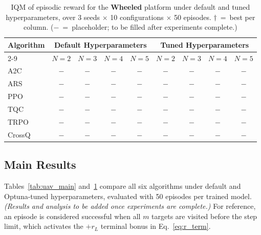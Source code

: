 \documentclass{article}
\begin{document}
\begin{table}[tbp]
\centering
\footnotesize
\caption{\small IQM of episodic reward for the \textbf{Wheeled} platform under default and tuned hyperparameters, over 3 seeds $\times$ 10 configurations $\times$ 50 episodes.
$\dagger$~=~best per column. ($-$~=~placeholder; to be filled after experiments complete.)}
\label{tab:whl_main}
\begin{tabular}{l|cccc|cccc}
    \toprule
    \multirow{2}{*}{\textbf{Algorithm}}
        & \multicolumn{4}{c|}{\textbf{Default Hyperparameters}}
        & \multicolumn{4}{c}{\textbf{Tuned Hyperparameters}} \\
    \cmidrule(lr){2-9}
           & $N=2$ & $N=3$ & $N=4$ & $N=5$
           & $N=2$ & $N=3$ & $N=4$ & $N=5$ \\
    \midrule
    A2C    & $-$ & $-$ & $-$ & $-$ & $-$ & $-$ & $-$ & $-$ \\
    ARS    & $-$ & $-$ & $-$ & $-$ & $-$ & $-$ & $-$ & $-$ \\
    PPO    & $-$ & $-$ & $-$ & $-$ & $-$ & $-$ & $-$ & $-$ \\
    TQC    & $-$ & $-$ & $-$ & $-$ & $-$ & $-$ & $-$ & $-$ \\
    TRPO   & $-$ & $-$ & $-$ & $-$ & $-$ & $-$ & $-$ & $-$ \\
    CrossQ & $-$ & $-$ & $-$ & $-$ & $-$ & $-$ & $-$ & $-$ \\
    \bottomrule
\end{tabular}
\vspace{-6pt}
\end{table}

\subsection{Main Results}
\label{sec:exp:main}

Tables~\ref{tab:uav_main} and~\ref{tab:whl_main} compare all six algorithms under default and Optuna-tuned hyperparameters, evaluated with 50 episodes per trained model. \textit{(Results and analysis to be added once experiments are complete.)} For reference, an episode is considered successful when all $m$ targets are visited before the step limit, which activates the $+r_L$ terminal bonus in Eq.~\eqref{eq:r_term}.
\end{document}
